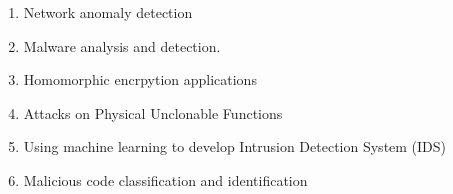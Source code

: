 \documentclass[conference]{IEEEtran}
\begin{document}
\vspace{\baselineskip} 

\begin{enumerate} 
 \setlength{\itemsep}{-2ex}  
 \setlength{\parskip}{0ex} 
 \setlength{\parsep}{0ex}
\item Network anomaly detection\hfil\break
\item Malware analysis and detection.\hfil\break
\item Homomorphic encrpytion applications \hfil\break
\item Attacks on Physical Unclonable Functions\hfil\break
\item Using machine learning to develop Intrusion Detection System (IDS)\hfil\break
\item Malicious code classification and identification
\end{enumerate}

\vspace{\baselineskip} 
\end{document}
